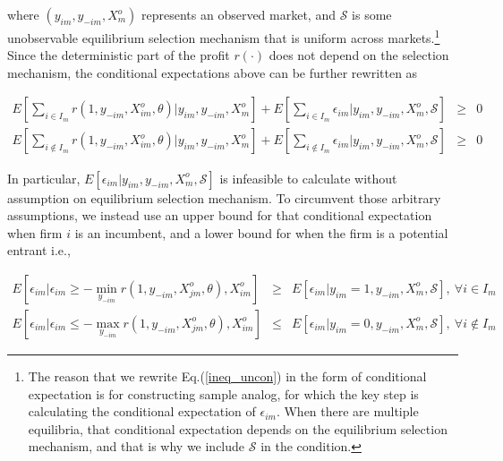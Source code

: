 \documentclass[a4paper]{article}
\begin{document}
where $(y_{im}, y_{-im}, X^o_{m})$ represents an observed market, and $\mathcal{S}$ is some unobservable equilibrium selection mechanism that is uniform across markets.\footnote{The reason that we rewrite Eq.(\ref{ineq_uncon}) in the form of conditional expectation is for constructing sample analog, for which the key step is calculating the conditional expectation of $\epsilon_{im}$. When there are multiple equilibria, that conditional expectation depends on the equilibrium selection mechanism, and that is why we include $\mathcal{S}$ in the condition.} Since the deterministic part of the profit $r(\cdot)$ does not depend on the selection mechanism, the conditional expectations above can be further rewritten as 


\begin{equation}
\begin{array}{rcl}
\displaystyle E[ \sum_{i \in I_m} r(1,y_{-im},X^o_{im},\theta)| y_{im}, y_{-im}, X^o_{m}]+ E[ \sum_{i \in I_m} \epsilon_{im} | y_{im}, y_{-im}, X^o_{m},\mathcal{S}] &\geq& 0 \\ 
\displaystyle  E[\sum_{i \not\in I_m} r(1,y_{-im},X^o_{im},\theta)| y_{im}, y_{-im}, X^o_{m}]+ E[\sum_{i \not\in I_m} \epsilon_{im} |y_{im}, y_{-im}, X^o_{m}, \mathcal{S}] &\geq& 0
\end{array}
\label{ineq_con}
\end{equation}






In particular, $E[\epsilon_{im}|y_{im},y_{-im}, X^o_{m}, \mathcal{S}]$ is infeasible to calculate without assumption on equilibrium selection mechanism. To circumvent those arbitrary assumptions, we instead use an upper bound for that conditional expectation when firm $i$ is an incumbent, and a lower bound for when the firm is a potential entrant i.e.,

\begin{equation}
\begin{array}{rcl}
\displaystyle E[\epsilon_{im}|\epsilon_{im} \geq - \min_{y_{-im}}r(1,y_{-im},X^o_{jm},\theta), X^o_{im}] & \geq & \displaystyle E[\epsilon_{im}|y_{im} = 1, y_{-im}, X^o_{m}, \mathcal{S}], \ \forall i \in I_m  \\
\displaystyle E[\epsilon_{im}|\epsilon_{im} \leq - \max_{y_{-im}}r(1,y_{-im},X^o_{jm},\theta), X^o_{im}] & \leq & \displaystyle E[\epsilon_{im}|y_{im} = 0, y_{-im}, X^o_{m}, \mathcal{S}], \ \forall i \not\in I_m 
\end{array}
\label{ineq_bound}
\end{equation}
\end{document}
